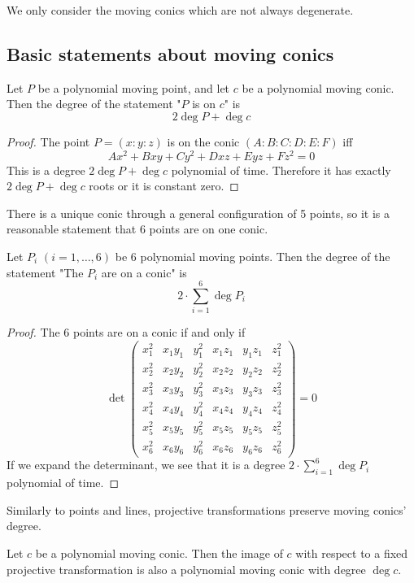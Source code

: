 \documentclass[a4paper]{article}
\begin{document}
We only consider the moving conics which are not always degenerate.

\subsection{Basic statements about moving conics}

\begin{theorem}
    Let $P$ be a polynomial moving point, and let $c$ be a polynomial moving conic. Then the degree of the statement "$P$ is on $c$" is
    $$2\deg P+ \deg c$$
\end{theorem}
\begin{proof}
    The point $P=(x:y:z)$ is on the conic $(A:B:C:D:E:F)$ iff
    $$Ax^2+Bxy+Cy^2+Dxz+Eyz+Fz^2=0$$
    This is a degree $2\deg P+ \deg c$ polynomial of time. Therefore it has exactly $2\deg P+ \deg c$ roots or it is constant zero.
\end{proof}

There is a unique conic through a general configuration of 5 points, so it is a reasonable statement that 6 points are on one conic.

\begin{theorem}\label{6onconic}
    Let $P_i$ $(i=1,\ldots ,6)$ be 6 polynomial moving points.
    Then the degree of the statement "The $P_i$ are on a conic" is 
    $$2\cdot \sum_{i=1}^6 \deg P_i$$
\end{theorem}
\begin{proof}
The 6 points are on a conic if and only if
   $$ \det
\begin{pmatrix}
x_1^2 & x_1 y_1 & y_1^2 & x_1 z_1 & y_1 z_1 & z_1^2 \\[4pt]
x_2^2 & x_2 y_2 & y_2^2 & x_2 z_2 & y_2 z_2 & z_2^2 \\[4pt]
x_3^2 & x_3 y_3 & y_3^2 & x_3 z_3 & y_3 z_3 & z_3^2 \\[4pt]
x_4^2 & x_4 y_4 & y_4^2 & x_4 z_4 & y_4 z_4 & z_4^2 \\[4pt]
x_5^2 & x_5 y_5 & y_5^2 & x_5 z_5 & y_5 z_5 & z_5^2 \\[4pt]
x_6^2 & x_6 y_6 & y_6^2 & x_6 z_6 & y_6 z_6 & z_6^2
\end{pmatrix}
= 0$$
If we expand the determinant, we see that it is a degree $2\cdot \sum_{i=1}^6 \deg P_i$ polynomial of time.
\end{proof}

Similarly to points and lines, projective transformations preserve moving conics' degree.
\begin{theorem}
    Let $c$ be a polynomial moving conic. Then the image of $c$ with respect to a fixed projective transformation is also a polynomial moving conic with degree $\deg c$.
\end{theorem}
\end{document}
